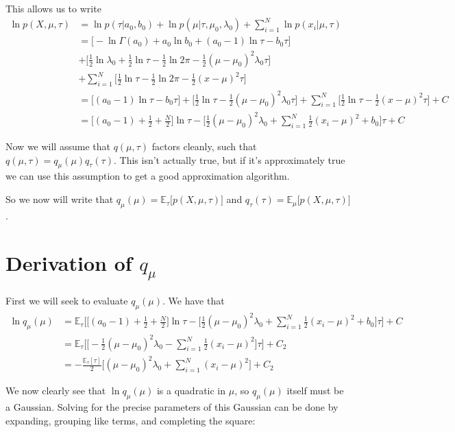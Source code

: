 \documentclass[11pt]{article}
\begin{document}
This allows us to write
\begin{align*}
\ln p(X, \mu, \tau) &= \ln p(\tau | a_0, b_0) + \ln p(\mu | \tau, \mu_0, \lambda_0) + \sum_{i=1}^N \ln p(x_i | \mu, \tau) \\
&= \big[ -\ln \Gamma(a_0) + a_0 \ln b_0 + (a_0 - 1) \ln \tau - b_0 \tau \big] \\
&+ \big[ \frac{1}{2}\ln \lambda_0 + \frac{1}{2}\ln \tau - \frac{1}{2} \ln 2\pi - \frac{1}{2} (\mu - \mu_0)^2 \lambda_0 \tau \big] \\
&+ \sum_{i=1}^{N} \big[ \frac{1}{2}\ln \tau - \frac{1}{2} \ln 2\pi - \frac{1}{2} (x - \mu)^2 \tau \big] \\
&= \big[(a_0 - 1) \ln \tau - b_0 \tau \big] + \big[ \frac{1}{2} \ln \tau - \frac{1}{2}(\mu - \mu_0)^2 \lambda_0 \tau \big] + \sum_{i=1}^{N} \big[ \frac{1}{2} \ln \tau - \frac{1}{2} (x- \mu)^2 \tau \big] + C \\
&= \big[ (a_0 - 1) + \frac{1}{2} + \frac{N}{2} \big] \ln \tau - \big[ \frac{1}{2}(\mu - \mu_0)^2 \lambda_0 + \sum_{i=1}^N \frac{1}{2}(x_i - \mu)^2 + b_0 \big] \tau + C
\end{align*}

Now we will assume that $q(\mu, \tau)$ factors cleanly, such that $q(\mu, \tau) = q_\mu(\mu) q_\tau(\tau)$. This isn't actually true, but if it's approximately true we can use this assumption to get a good approximation algorithm.

So we now will write that $q_\mu(\mu) = \mathbb{E}_\tau \big[ p(X, \mu, \tau) \big]$ and $q_\tau(\tau) = \mathbb{E}_\mu \big[ p(X, \mu, \tau) \big]$.

\section{Derivation of $q_\mu$}
First we will seek to evaluate $q_\mu(\mu)$.
We have that 
\begin{align*}
\ln q_\mu(\mu) &= \mathbb{E}_\tau \Big[ \big[ (a_0 - 1) + \frac{1}{2} + \frac{N}{2} \big] \ln \tau - \big[ \frac{1}{2}(\mu - \mu_0)^2 \lambda_0 + \sum_{i=1}^N \frac{1}{2}(x_i - \mu)^2 + b_0 \big] \tau \Big] + C \\
&= \mathbb{E}_\tau \Big[ \big[ -\frac{1}{2}(\mu - \mu_0)^2 \lambda_0 - \sum_{i=1}^N \frac{1}{2}(x_i - \mu)^2 \big] \tau \Big] + C_2 \\
&= -\frac{\mathbb{E}_\tau [\tau]}{2} \big[ (\mu - \mu_0)^2 \lambda_0 + \sum_{i=1}^N (x_i - \mu)^2 \big] + C_2
\end{align*}

We now clearly see that $\ln q_\mu(\mu)$ is a quadratic in $\mu$, so $q_\mu(\mu)$ itself must be a Gaussian. Solving for the precise parameters of this Gaussian can be done by expanding, grouping like terms, and completing the square:
\end{document}
